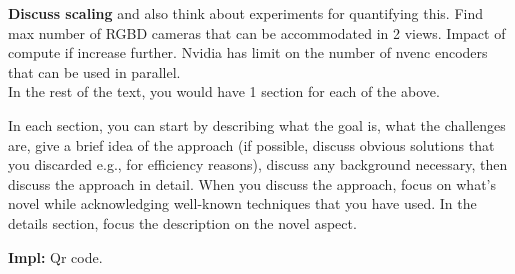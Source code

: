 \textbf{Discuss scaling} and also think about experiments for quantifying this. Find max number of RGBD cameras that can be accommodated in 2 views. Impact of compute if increase further. Nvidia has limit on the number of nvenc encoders that can be used in parallel.
\\

In the rest of the text, you would have 1 section for each of the above.

In each section, you can start by describing what the goal is, what the challenges are, give a brief idea of the approach (if possible, discuss obvious solutions that you discarded e.g., for efficiency reasons), discuss any background necessary, then discuss the approach in detail. When you discuss the approach, focus on what's novel while acknowledging well-known techniques that you have used. In the details section, focus the description on the novel aspect.


\textbf{Impl:} Qr code.